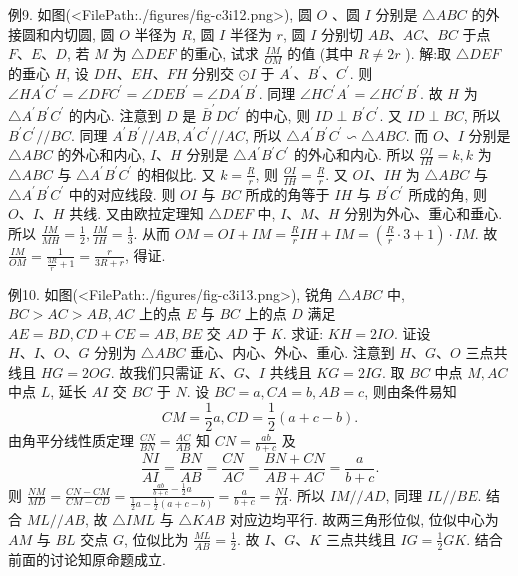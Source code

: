 例9. 如图(<FilePath:./figures/fig-c3i12.png>), 圆 $O$ 、圆 $I$ 分别是 $\triangle A B C$ 的外接圆和内切圆, 圆 $O$ 半径为 $R$, 圆 $I$ 半径为 $r$, 圆 $I$ 分别切 $A B 、 A C 、 B C$ 于点 $F 、 E 、 D$, 若 $M$ 为 $\triangle D E F$ 的重心, 试求 $\frac{I M}{O M}$ 的值 (其中 $R \neq 2 r$ ).
解:取 $\triangle D E F$ 的垂心 $H$, 设 $D H 、 E H 、 F H$ 分别交 $\odot I$ 于 $A^{\prime} 、 B^{\prime} 、 C^{\prime}$.
则 $\angle H A^{\prime} C^{\prime}=\angle D F C^{\prime}=\angle D E B^{\prime}=\angle D A^{\prime} B^{\prime}$.
同理 $\angle H C^{\prime} A^{\prime}=\angle H C^{\prime} B^{\prime}$. 故 $H$ 为 $\triangle A^{\prime} B^{\prime} C^{\prime}$ 的内心.
注意到 $D$ 是 $\bar{B}^{\prime} D C^{\prime}$ 的中心, 则 $I D \perp B^{\prime} C^{\prime}$.
又 $I D \perp B C$, 所以 $B^{\prime} C^{\prime} / / B C$.
同理 $A^{\prime} B^{\prime} / / A B, A^{\prime} C^{\prime} / / A C$, 所以 $\triangle A^{\prime} B^{\prime} C^{\prime} \backsim \triangle A B C$.
而 $O 、 I$ 分别是 $\triangle A B C$ 的外心和内心, $I 、 H$ 分别是 $\triangle A^{\prime} B^{\prime} C^{\prime}$ 的外心和内心.
所以 $\frac{O I}{I H}=k, k$ 为 $\triangle A B C$ 与 $\triangle A^{\prime} B^{\prime} C^{\prime}$ 的相似比.
又 $k=\frac{R}{r}$, 则 $\frac{O I}{I H}=\frac{R}{r}$.
又 $O I 、 I H$ 为 $\triangle A B C$ 与 $\triangle A^{\prime} B^{\prime} C^{\prime}$ 中的对应线段.
则 $O I$ 与 $B C$ 所成的角等于 $I H$ 与 $B^{\prime} C^{\prime}$ 所成的角, 则 $O 、 I 、 H$ 共线.
又由欧拉定理知 $\triangle D E F$ 中, $I 、 M 、 H$ 分别为外心、重心和垂心.
所以 $\frac{I M}{M H}=\frac{1}{2}, \frac{I M}{I H}=\frac{1}{3}$.
从而 $O M=O I+I M=\frac{R}{r} I H+I M=\left(\frac{R}{r} \cdot 3+1\right) \cdot I M$.
故 $\frac{I M}{O M}=\frac{1}{\frac{3 R}{r}+1}=\frac{r}{3 R+r}$, 得证.



例10. 如图(<FilePath:./figures/fig-c3i13.png>), 锐角 $\triangle A B C$ 中, $B C> A C>A B, A C$ 上的点 $E$ 与 $B C$ 上的点 $D$ 满足 $A E=B D, C D+C E=A B, B E$ 交 $A D$ 于 $K$. 求证: $K H=2 I O$.
证设 $H 、 I 、 O 、 G$ 分别为 $\triangle A B C$ 垂心、内心、外心、重心.
注意到 $H 、 G 、 O$ 三点共线且 $H G=2 O G$.
故我们只需证 $K 、 G 、 I$ 共线且 $K G=2 I G$.
取 $B C$ 中点 $M, A C$ 中点 $L$, 延长 $A I$ 交 $B C$ 于 $N$.
设 $B C=a, C A=b, A B=c$, 则由条件易知
$$
C M=\frac{1}{2} a, C D=\frac{1}{2}(a+c-b) .
$$
由角平分线性质定理 $\frac{C N}{B N}=\frac{A C}{A B}$ 知 $C N=\frac{a b}{b+c}$ 及
$$
\frac{N I}{A I}=\frac{B N}{A B}=\frac{C N}{A C}=\frac{B N+C N}{A B+A C}=\frac{a}{b+c} .
$$
则 $\frac{N M}{M D}=\frac{C N-C M}{C M-C D}=\frac{\frac{a b}{b+c}-\frac{1}{2} a}{\frac{1}{2} a-\frac{1}{2}(a+c-b)}=\frac{a}{b+c}=\frac{N I}{I A}$.
所以 $I M / / A D$, 同理 $I L / / B E$.
结合 $M L / / A B$, 故 $\triangle I M L$ 与 $\triangle K A B$ 对应边均平行.
故两三角形位似, 位似中心为 $A M$ 与 $B L$ 交点 $G$, 位似比为 $\frac{M L}{A B}=\frac{1}{2}$.
故 $I 、 G 、 K$ 三点共线且 $I G=\frac{1}{2} G K$.
结合前面的讨论知原命题成立.


